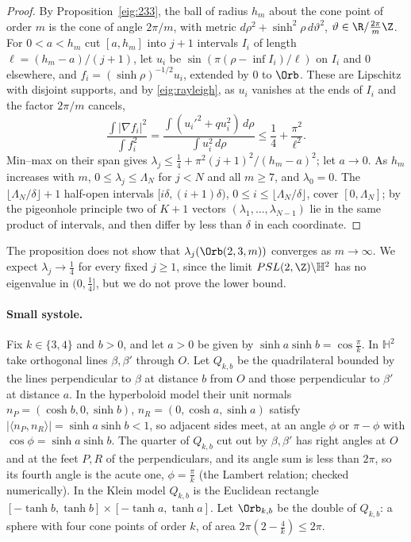 \begin{proof}
By Proposition~\ref{eig:233}, the ball of radius $h_m$ about the cone point of order $m$ is the cone of angle $2\pi/m$, with metric $d\rho^2+\sinh^2\rho\,d\vartheta^2$, $\vartheta\in\R/\frac{2\pi}m\Z$. For $0<a<h_m$ cut $[a,h_m]$ into $j+1$ intervals $I_i$ of length $\ell=(h_m-a)/(j+1)$, let $u_i$ be $\sin(\pi(\rho-\inf I_i)/\ell)$ on $I_i$ and $0$ elsewhere, and $f_i=(\sinh\rho)^{-1/2}u_i$, extended by $0$ to $\Orb$. These are Lipschitz with disjoint supports, and by \eqref{eig:rayleigh}, as $u_i$ vanishes at the ends of $I_i$ and the factor $2\pi/m$ cancels,
\[
  \frac{\int|\nabla f_i|^2}{\int f_i^2}=\frac{\int(u_i'^2+qu_i^2)\,d\rho}{\int u_i^2\,d\rho}\le\frac14+\frac{\pi^2}{\ell^2}.
\]
Min--max on their span gives $\lambda_j\le\frac14+\pi^2(j+1)^2/(h_m-a)^2$; let $a\to0$. As $h_m$ increases with $m$, $0\le\lambda_j\le\Lambda_N$ for $j<N$ and all $m\ge7$, and $\lambda_0=0$. The $\lfloor\Lambda_N/\delta\rfloor+1$ half-open intervals $[i\delta,(i+1)\delta)$, $0\le i\le\lfloor\Lambda_N/\delta\rfloor$, cover $[0,\Lambda_N]$; by the pigeonhole principle two of $K+1$ vectors $(\lambda_1,\dots,\lambda_{N-1})$ lie in the same product of intervals, and then differ by less than $\delta$ in each coordinate.
\end{proof}

The proposition does not show that $\lambda_j(\Orb(2,3,m))$ converges as $m\to\infty$. We expect $\lambda_j\to\frac14$ for every fixed $j\ge1$, since the limit $PSL(2,\Z)\backslash\mathbb H^2$ has no eigenvalue in $(0,\frac14]$, but we do not prove the lower bound.

\paragraph{Small systole.} Fix $k\in\{3,4\}$ and $b>0$, and let $a>0$ be given by $\sinh a\sinh b=\cos\frac\pi k$. In $\mathbb H^2$ take orthogonal lines $\beta,\beta'$ through $O$. Let $Q_{k,b}$ be the quadrilateral bounded by the lines perpendicular to $\beta$ at distance $b$ from $O$ and those perpendicular to $\beta'$ at distance $a$. In the hyperboloid model their unit normals $n_P=(\cosh b,0,\sinh b)$, $n_R=(0,\cosh a,\sinh a)$ satisfy $|\langle n_P,n_R\rangle|=\sinh a\sinh b<1$, so adjacent sides meet, at an angle $\phi$ or $\pi-\phi$ with $\cos\phi=\sinh a\sinh b$. The quarter of $Q_{k,b}$ cut out by $\beta,\beta'$ has right angles at $O$ and at the feet $P,R$ of the perpendiculars, and its angle sum is less than $2\pi$, so its fourth angle is the acute one, $\phi=\frac\pi k$ (the Lambert relation; checked numerically). In the Klein model $Q_{k,b}$ is the Euclidean rectangle $[-\tanh b,\tanh b]\times[-\tanh a,\tanh a]$. Let $\Orb_{k,b}$ be the double of $Q_{k,b}$: a sphere with four cone points of order $k$, of area $2\pi(2-\frac4k)\le2\pi$.

